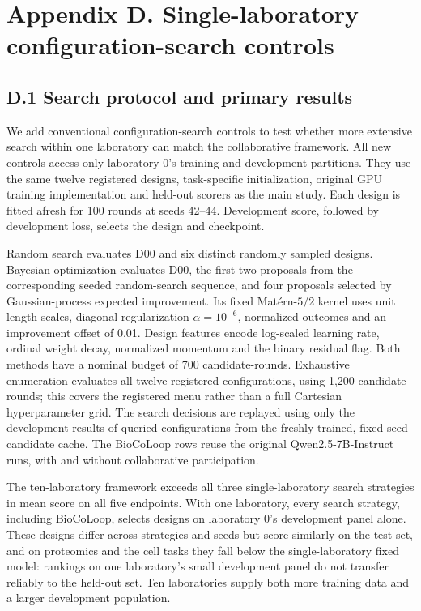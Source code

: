 \clearpage
\section*{Appendix D. Single-laboratory configuration-search controls}
\label{app:single-lab-search}
\setcounter{table}{0}
\renewcommand{\thetable}{D.\arabic{table}}
\renewcommand{\theHtable}{D.\arabic{table}}

\subsection*{D.1 Search protocol and primary results}
We add conventional configuration-search controls to test whether more extensive search within one laboratory can match the collaborative framework. All new controls access only laboratory 0's training and development partitions. They use the same twelve registered designs, task-specific initialization, original GPU training implementation and held-out scorers as the main study. Each design is fitted afresh for 100 rounds at seeds 42--44. Development score, followed by development loss, selects the design and checkpoint.

Random search evaluates D00 and six distinct randomly sampled designs. Bayesian optimization evaluates D00, the first two proposals from the corresponding seeded random-search sequence, and four proposals selected by Gaussian-process expected improvement. Its fixed Mat\'ern-$5/2$ kernel uses unit length scales, diagonal regularization $\alpha=10^{-6}$, normalized outcomes and an improvement offset of 0.01. Design features encode log-scaled learning rate, ordinal weight decay, normalized momentum and the binary residual flag. Both methods have a nominal budget of 700 candidate-rounds. Exhaustive enumeration evaluates all twelve registered configurations, using 1,200 candidate-rounds; this covers the registered menu rather than a full Cartesian hyperparameter grid. The search decisions are replayed using only the development results of queried configurations from the freshly trained, fixed-seed candidate cache. The BioCoLoop rows reuse the original Qwen2.5-7B-Instruct runs, with and without collaborative participation.



The ten-laboratory framework exceeds all three single-laboratory search strategies in mean score on all five endpoints. With one laboratory, every search strategy, including BioCoLoop, selects designs on laboratory 0's development panel alone. These designs differ across strategies and seeds but score similarly on the test set, and on proteomics and the cell tasks they fall below the single-laboratory fixed model: rankings on one laboratory's small development panel do not transfer reliably to the held-out set. Ten laboratories supply both more training data and a larger development population.

